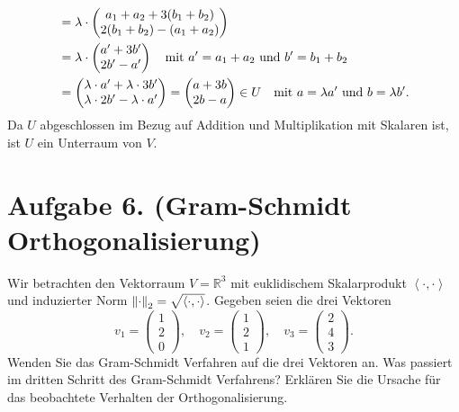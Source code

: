\documentclass[german,12pt]{homework}
\newcommand{\RR}{\mathbb{R}}
\newcommand{\dotproduct}[2]{\left\langle#1, #2\right\rangle}
\DeclarePairedDelimiter{\norm}{\lVert}{\rVert}
\DeclarePairedDelimiter{\enbrace}{(}{)}
\begin{document}
\begin{enumerate}
\begin{align*}
            &= \lambda \cdot \begin{pmatrix}
                a_1 + a_2 + 3\enbrace*{b_1 + b_2}\\2\enbrace*{b_1 + b_2} - \enbrace*{a_1 + a_2}
            \end{pmatrix}\\
            &= \lambda \cdot \begin{pmatrix}
                a' + 3b'\\2b' - a'
            \end{pmatrix} \quad \text{mit }a' = a_1 + a_2\text{ und }b' = b_1 + b_2\\
            &= \begin{pmatrix}
                \lambda \cdot a' + \lambda \cdot 3b'\\
                \lambda \cdot 2b' - \lambda \cdot a'
            \end{pmatrix} = \begin{pmatrix}
                a + 3b\\2b - a
            \end{pmatrix} \in U \quad \text{mit }a = \lambda{a'}\text{ und }b = \lambda{b'}.
        \end{align*}
        Da \(U\) abgeschlossen im Bezug auf Addition und Multiplikation mit Skalaren ist, ist \(U\) ein Unterraum von \(V\).
    \end{enumerate}

    \section*{Aufgabe 6. (Gram-Schmidt Orthogonalisierung)}

    \begin{problem}
        Wir betrachten den Vektorraum \(V = \RR^3\) mit euklidischem Skalarprodukt \(\dotproduct{\cdot}{\cdot}\) und induzierter Norm \(\norm*{\cdot}_2 = \sqrt{\dotproduct{\cdot}{\cdot}}\). Gegeben seien die drei Vektoren
        \[v_1 = \begin{pmatrix}1\\2\\0\end{pmatrix}, \quad v_2 = \begin{pmatrix}1\\2\\1\end{pmatrix}, \quad v_3 = \begin{pmatrix}2\\4\\3\end{pmatrix}.\]
        Wenden Sie das Gram-Schmidt Verfahren auf die drei Vektoren an. Was passiert im dritten Schritt des Gram-Schmidt Verfahrens? Erklären Sie die Ursache für das beobachtete Verhalten der Orthogonalisierung.
    \end{problem}
\end{document}

